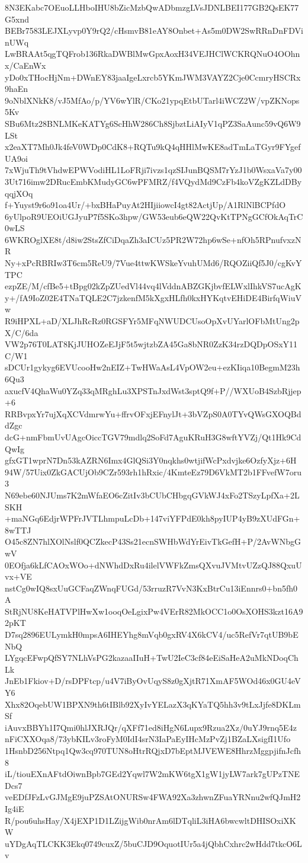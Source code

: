 8N3EKabc7OEuoLLHboIHU8bZicMzbQwADbmzgLVsJDNLBEI177GB2QsEK77G5xnd
BEBr7583LEJXLyvp0Y9rQ2/cHsmvB81eAY8Onbet+As5m0DW2SwRRnDnFDVinUWq
LwBRAAt5qgTQFrob136RkaDWBlMwGpxAoxH34VEJHClWCKRQNuO4OOhnx/CaEnWx
yDo0xTHocHjNm+DWnEY83jaaIgeLxrcb5YKmJWM3VAYZ2Cje0CcmryHSCRx9haEn
9oNblXNkK8/vJ5MfAo/p/YV6wYlR/CKo21ypqEtbUTarl4iWCZ2W/vpZKNops5Kv
SBu6Mtz28BNLMKeKATYg6ScHhW286Ch8SjbztLiAIyV1qPZ3SaAunc59vQ6W9LSt
x2eaXT7Mh0Jk4feV0WDp0CdK8+RQTu9kQ4qHHlMwKE8adTmLaTGyr9FYgefUA9oi
7xWjuTh9tVhdwEPWVodiHL1LoFRji7ivzs1qzSIJunBQSM7rYzJ1b0WsxaVa7y00
3Ut716imw2DRucEmbKMudyGC6wPFMRZ/f4VQydMd9CzFb4koVZgKZLdDByqqjXOq
f+Yuyst9r6o91oa4Ur/+bxBHaPuyAt2HIjiiowcI4gt82ActjUp/A1RlNlBCPfdO
6yUlpoR9UEOiUGJyuP7f5SKo3hpw/GW53eub6eQW22QvKtTPNgGCfOkAqTrC0wLS
6WKROglXE8t/d8iw2StsZfCiDqaZh3aICUz5PR2W72hp6wSe+nfOh5RPnufvxzNR
Ny+xPcRBRIw3T6cm5ReU9/7Vue4ttwKWSkeYvuhUMd6/RQOZiiQf5J0/cgKvYTPC
ezpZE/M/cfBe5+tBpg02kZpZUedVl44vq4lVddnABZGKjbvfELWxlIhkVS7ucAgK
y+/fA9IoZ02E4TNaTQLE2C7jzkenfM5kXgxHLfh0kxHYKqtvEHiDE4BirfqWiuVw
R9iHPXL+aD/XLJhRcRz0RGSFYr5MFqNWUDCUsoOpXvUYarlOFbMtUng2pX/C/6da
VW2p76T0LAT8KjJUHOZeEJjF5t5wjtzbZA45Ga8bNR0ZzK34rzDQDpOSxY11C/W1
sDCUr1gykyg6EVUcooHw2nEIZ+TwHWaAsL4VpOW2eu+ezKIiqa10BegmM23h6Qu3
axucfV4QhaWu0YZq33qMRghLu3XPSTnJxdWst3sptQ9f+P//WXUoB4SzbRjjep+6
RRBvpxYr7ujXqXCVdmrwYu+ffrvOFxjEFnylJt+3bVZpS0A0TYvQWsGXOQBddZgc
dcG+nmFbmUvUAgcOiccTGV79mdlq2SoFd7AguKRuH3G8wftYVZj/Qt1Hk9CdQwIg
gfxGT1wprN7Dn53kAZRN6Imx4GlQSi3Y0nqkhs0wtjifWcPxdvjke6OzfyXjz+6H
94W/57Uix0ZkGACUjOb9CZr593rh1hRxic/4KmteEz79D6VkMT2b1FFvefW7oru3
N69ebe60NJUms7K2mWfaEO6cZitIv3bCUbCHbgqGVkWJ4xFo2TSzyLpfXa+2LSKH
+maNGq6EdjrWPFrJVTLhmpuLcDb+147viYFPdE0kh8pyIUP4yB9zXUdFGn+8wTTJ
O45c8ZN7hlXOlNslf0QCZkecP43Ss21ecnSWHbWdYrEivTkGefH+P/2AvWNbgGwV
0EOfja6kLfCAOxWOo+dNWhdDxRu4ilelVWFkZmsQXvuJVMtvUZzQJ88QxuUvx+VE
nstCg0wIQ8sxUuGCFaqZWnqFUGd/53rruzR7VvN3KxBtrCu13iEnnrs0+bn5fh0A
StRjNU8KeHATVPlHwXw1ooqOeLgixPw4VErR82MkOCC1o0OsXOHS3kzt16A92pKT
D7sq2896EULymkH0mpsA6IHEYhg8mVqb0gxRV4X6kCV4/uc5RefVr7qtUB9bENbQ
LYgqcEFwpQfSY7NLhVsPG2kazaaIIuH+TwU2IeC3cf84eEiSaHeA2uMkNDoqChLk
JnEb1Fkiov+D/rsDPFtcp/u4V7iByOvUqyS8z0gXjtR71XmAF5WOd46x0GU4eVY6
Xhx82OqebUW1BPXN9th6tIBlb92XyIvYELazX3qKYaTQ5hh3v9tLxJjfe8DKLmSf
iAuvxBBYh1I7Qmi0hlJXRJQr/qXFf71ed8iHgN6Lupx9Rzua2Xz/0uYJ9rnq5E4z
nFiCXXOqa8/73ybKILv3roFyM0IdI4srN3IaPaEyIHcMzPvZj1BZaLXsigfI1Ufo
1HsnbD256Ntpq1Qw3cq970TUN8oHtrRQjxD7bEptMJVEWE8HhrzMggpjifnJcfh8
iL/tiouEXnAFtdOiwnBpb7GEd2Yqwl7W2mKW6tgX1gW1jyLW7ark7gUPzTNEDcs7
veEDfJFzLvGJMgE9juPZSAtONURSw4FWA92Xa3zhwnZFuaYRNnu2wfQJmH2Ig4iE
R/pou6uhsHay/X4jEXP1D1LZijgWib0nrAm6lDTqliL3iHA6bwcwltDHISOxiXKW
uYDgAqTLCKK3Ekq0749cuxZ/5buCJD9OquotIUr5a4jQbhCxhrc2wHdd7tkcO6Lv
